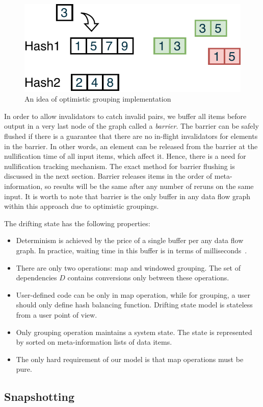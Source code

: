 \begin{figure}[htbp]
  \centering
  \includegraphics[width=.35\textwidth]{pics/grouping-invalidation}
  \caption{An idea of optimistic grouping implementation}
  \label {optimistic-grouping}
\end{figure} 
 
In order to allow invalidators to catch invalid pairs, we buffer all items before output in a very last node of the graph called a {\em barrier}. The barrier can be safely flushed if there is a guarantee that there are no in-flight invalidators for elements in the barrier. In other words, an element can be released from the barrier at the nullification time of all input items, which affect it. Hence, there is a need for nullification tracking mechanism. The exact method for barrier flushing is discussed in the next section. Barrier releases items in the order of meta-information, so results will be the same after any number of reruns on the same input. It is worth to note that barrier is the only buffer in any data flow graph within this approach due to optimistic groupings. 

The drifting state has the following properties:
\begin{itemize}
    \item Determinism is achieved by the price of a single buffer per any data flow graph. In practice, waiting time in this buffer is in terms of milliseconds~\cite{we2018adbis}.
    \item There are only two operations: map and windowed grouping. The set of dependencies $D$ contains conversions only between these operations.
    \item User-defined code can be only in map operation, while for grouping, a user should only define hash balancing function. Drifting state model is stateless from a user point of view.
    \item Only grouping operation maintains a system state. The state is represented by sorted on meta-information lists of data items.
    \item The only hard requirement of our model is that map operations must be pure.
\end{itemize}

\subsection{Snapshotting}

